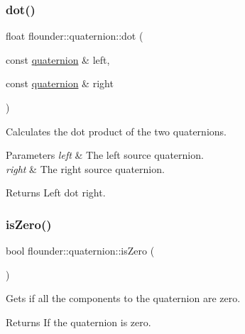 \subsubsection{\texorpdfstring{dot()}{dot()}}
{\footnotesize\ttfamily float flounder\+::quaternion\+::dot (\begin{DoxyParamCaption}\item[{const \hyperlink{classflounder_1_1quaternion}{quaternion} \&}]{left,  }\item[{const \hyperlink{classflounder_1_1quaternion}{quaternion} \&}]{right }\end{DoxyParamCaption})\hspace{0.3cm}{\ttfamily [static]}}



Calculates the dot product of the two quaternions. 


\begin{DoxyParams}{Parameters}
{\em left} & The left source quaternion. \\
\hline
{\em right} & The right source quaternion. \\
\hline
\end{DoxyParams}
\begin{DoxyReturn}{Returns}
Left dot right. 
\end{DoxyReturn}
\mbox{\label{classflounder_1_1quaternion_a36b18505b6d34816d57ff6f29419fbc2}} 
\subsubsection{\texorpdfstring{is\+Zero()}{isZero()}}
{\footnotesize\ttfamily bool flounder\+::quaternion\+::is\+Zero (\begin{DoxyParamCaption}{ }\end{DoxyParamCaption})}



Gets if all the components to the quaternion are zero. 

\begin{DoxyReturn}{Returns}
If the quaternion is zero. 
\end{DoxyReturn}
\mbox{\label{classflounder_1_1quaternion_a2b802d5ca0ff8a010f5b3c57a86706f8}} 
